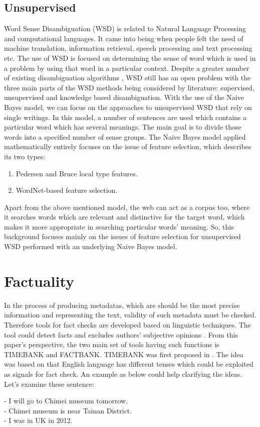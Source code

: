 \subsection*{Unsupervised}
Word Sense Disambiguation (WSD) is related to Natural Language Processing and computational languages. It came into being when people felt the need of machine translation, information retrieval, speech processing and text processing etc. The use of WSD is focused on determining the sense of word which is used in a problem by using that word in a particular context. Despite a greater number of existing disambiguation algorithms , WSD still has an open problem with the three main parts of the WSD methods being considered by literature: supervised, unsupervised and knowledge based disambiguation.
With the use of the Naive Bayes model, we can focus on the approaches to unsupervised WSD that rely on single writings. In this model, a number of sentences are used which contains a particular word which has several meanings. The main goal is to divide those words into a specified number of sense groups.
The Naive Bayes model applied mathematically entirely focuses on the issue of feature selection, which describes its two types:
\begin{enumerate}
	\item Pedersen and Bruce local type features.
	\item WordNet-based feature selection.
\end{enumerate}
Apart from the above mentioned model, the web can act as a corpus too, where it searches words which are relevant and distinctive for the target word, which makes it more appropriate in searching particular words' meaning.
So, this background focuses mainly on the issues of feature selection for unsupervised WSD performed with an underlying Naive Bayes model.


\section*{Factuality}
In the process of producing metadatas, which are should be the most precise information and representing the text, validity of such metadata must be checked. Therefore tools for fact checks are developed based on linguistic techniques.  The tool could detect facts and excludes authors' subjective opinions \cite{agerri2015big}. From this paper's perspective, the two main set of tools having such functions is TIMEBANK and FACTBANK.
TIMEBANK was first proposed in \cite{pustejovsky2003timebank}. The idea was based on that English language has different tenses which could be exploited as signals for fact check. An example as below could help clarifying the ideas. Let's examine these sentence:\\
\begin{flushleft}
	-	I will go to Chimei museum tomorrow.\\
	-	Chimei museum is near Tainan District.\\
	-	I was in UK in 2012.\\
\end{flushleft}

